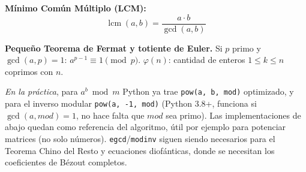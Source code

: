 \textbf{Mínimo Común Múltiplo (LCM):}
\[
\operatorname{lcm}(a, b) = \frac{a \cdot b}{\gcd(a, b)}
\]

\textbf{Pequeño Teorema de Fermat y totiente de Euler.}
Si \(p\) primo y \(\gcd(a,p)=1\): \(a^{p-1}\equiv 1 \pmod p\).
\(\varphi(n)\): cantidad de enteros \(1\le k\le n\) coprimos con \(n\).

\textit{En la práctica}, para \(a^b \bmod m\) Python ya trae \texttt{pow(a, b, mod)} optimizado, y para el inverso modular \texttt{pow(a, -1, mod)} (Python 3.8+, funciona si \(\gcd(a, mod) = 1\), no hace falta que \(mod\) sea primo). Las implementaciones de abajo quedan como referencia del algoritmo, útil por ejemplo para potenciar matrices (no solo números). \texttt{egcd}/\texttt{modinv} siguen siendo necesarios para el Teorema Chino del Resto y ecuaciones diofánticas, donde se necesitan los coeficientes de Bézout completos.
